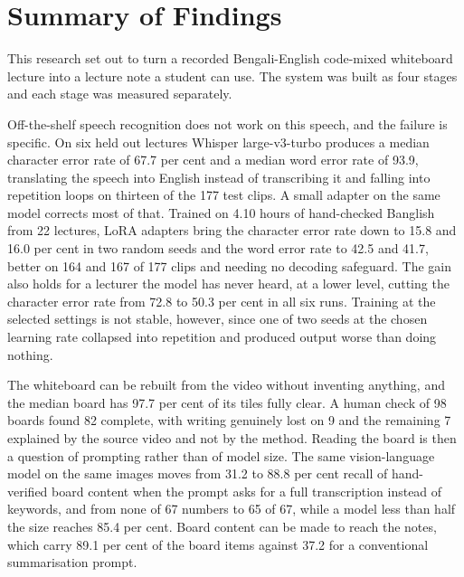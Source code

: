 
\section{Summary of Findings}

This research set out to turn a recorded Bengali-English code-mixed whiteboard lecture into
a lecture note a student can use. The system was built as four stages and each stage was
measured separately.

Off-the-shelf speech recognition does not work on this speech, and the failure is
specific. On six held out lectures Whisper large-v3-turbo produces a median character
error rate of 67.7 per cent and a median word error rate of 93.9, translating the speech
into English instead of transcribing it and falling into repetition loops on thirteen of
the 177 test clips. A small adapter on the same model corrects most of that. Trained on
4.10 hours of hand-checked Banglish from 22 lectures, LoRA adapters bring the character
error rate down to 15.8 and 16.0 per cent in two random seeds and the word error rate to
42.5 and 41.7, better on 164 and 167 of 177 clips and needing no decoding safeguard. The
gain also holds for a lecturer the model has never heard, at a lower level, cutting the
character error rate from 72.8 to 50.3 per cent in all six runs. Training at the selected
settings is not stable, however, since one of two seeds at the chosen learning rate
collapsed into repetition and produced output worse than doing nothing.

The whiteboard can be rebuilt from the video without inventing anything, and the median
board has 97.7 per cent of its tiles fully clear. A human check of 98 boards found 82
complete, with writing genuinely lost on 9 and the remaining 7 explained by the source
video and not by the method. Reading the board is then a question of prompting rather
than of model size. The same vision-language model on the same images moves from 31.2 to
88.8 per cent recall of hand-verified board content when the prompt asks for a full
transcription instead of keywords, and from none of 67 numbers to 65 of 67, while a model
less than half the size reaches 85.4 per cent. Board content can be made to reach the
notes, which carry 89.1 per cent of the board items against 37.2 for a conventional
summarisation prompt.

